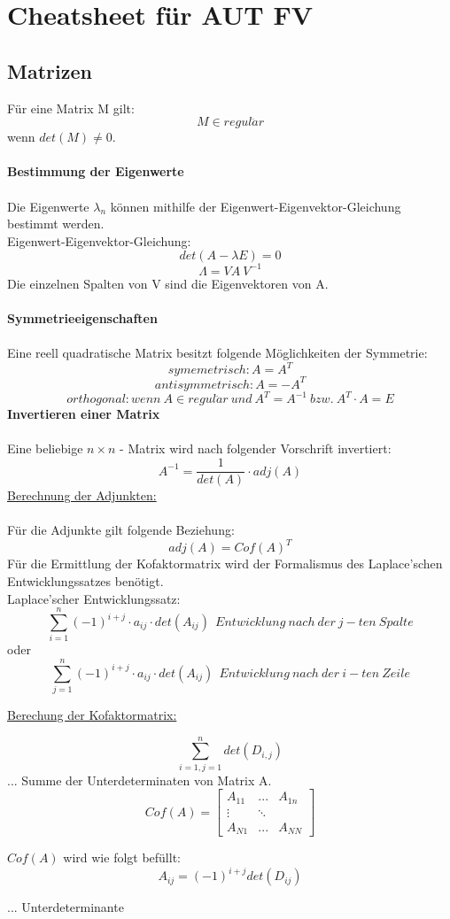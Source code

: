 \documentclass[12pt]{article}
\begin{document}
\section{Cheatsheet für AUT FV}
\subsection{Matrizen}
Für eine Matrix M gilt:
\[ M \in regul\ddot{a}r\] 
wenn $ det(M) \neq 0 $. \\ \\
\textbf{Bestimmung der Eigenwerte} \\ \\
Die Eigenwerte $ \lambda_{n} $ können mithilfe der Eigenwert-Eigenvektor-Gleichung bestimmt werden. \\
Eigenwert-Eigenvektor-Gleichung:
\[ det(A - \lambda E) = 0 \]
\[ \Lambda = VA \ V^{-1} \] 
Die einzelnen Spalten von V sind die Eigenvektoren von A. \\ \\
\textbf{Symmetrieeigenschaften}\\ \\
Eine reell quadratische Matrix besitzt folgende Möglichkeiten der Symmetrie:\\
\[ symemetrisch: A = A^{T}\]
\[ antisymmetrisch: A = -A^{T} \]
\[ orthogonal: wenn \ A \in regul\ddot{a}r \ und \ A^{T} = A^{-1} \ bzw.\  A^{T} \cdot A = E \]
\textbf{Invertieren einer Matrix} \\ \\
Eine beliebige $ n \times n $ - Matrix wird nach folgender Vorschrift invertiert: \\
\[ A^{-1} = \frac{1}{det(A)} \cdot adj(A) \]
\underline{Berechnung der Adjunkten:} \\ \\
Für die Adjunkte gilt folgende Beziehung:
\[ adj(A) = Cof(A)^{T} \]
Für die Ermittlung der Kofaktormatrix wird der Formalismus des Laplace'schen Entwicklungssatzes benötigt. \\
Laplace'scher Entwicklungssatz:
\[ \sum_{i=1}^{n}(-1)^{i+j} \cdot a_{ij} \cdot det(A_{ij}) \ \ Entwicklung \ nach \ der \ j-ten \ Spalte\]
oder
\[ \sum_{j=1}^{n}(-1)^{i+j} \cdot a_{ij} \cdot det(A_{ij}) \ \ Entwicklung \ nach \ der \ i-ten \ Zeile\]

\underline{Berechung der Kofaktormatrix:}

\[\sum_{i=1,j=1}^{n} det(D_{i,j}) \]... Summe der Unterdeterminaten von Matrix A. 
\[Cof(A)=
\begin{bmatrix}
   A_{11}&...&A_{1n}\\
   \vdots & \ddots&\\
   A_{N1}&...&A_{NN}
\end{bmatrix}
\]

\(Cof(A)\) wird wie folgt befüllt:
\[A_{ij}=(-1)^{i+j}det(D_{ij})\] 

\begin{flushright}
\vspace{-0.9cm}  ... Unterdeterminante
\end{flushright}
\end{document}
